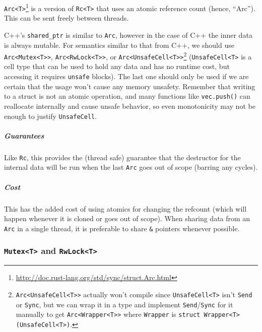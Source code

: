 \documentclass[a4paper,]{book}
\renewcommand{\href}[2]{#2\footnote{\url{#1}}}
\let\oldsubparagraph\subparagraph
\renewcommand{\subparagraph}[1]{\oldsubparagraph{#1}\mbox{}}
\begin{document}
\href{http://doc.rust-lang.org/std/sync/struct.Arc.html}{\texttt{Arc\textless{}T\textgreater{}}}
is a version of \texttt{Rc\textless{}T\textgreater{}} that uses an
atomic reference count (hence, ``Arc''). This can be sent freely between
threads.

C++'s \texttt{shared\_ptr} is similar to \texttt{Arc}, however in the
case of C++ the inner data is always mutable. For semantics similar to
that from C++, we should use
\texttt{Arc\textless{}Mutex\textless{}T\textgreater{}\textgreater{}},
\texttt{Arc\textless{}RwLock\textless{}T\textgreater{}\textgreater{}},
or
\texttt{Arc\textless{}UnsafeCell\textless{}T\textgreater{}\textgreater{}}\footnote{\texttt{Arc\textless{}UnsafeCell\textless{}T\textgreater{}\textgreater{}}
  actually won't compile since
  \texttt{UnsafeCell\textless{}T\textgreater{}} isn't \texttt{Send} or
  \texttt{Sync}, but we can wrap it in a type and implement
  \texttt{Send}/\texttt{Sync} for it manually to get
  \texttt{Arc\textless{}Wrapper\textless{}T\textgreater{}\textgreater{}}
  where \texttt{Wrapper} is
  \texttt{struct\ Wrapper\textless{}T\textgreater{}(UnsafeCell\textless{}T\textgreater{})}.}
(\texttt{UnsafeCell\textless{}T\textgreater{}} is a cell type that can
be used to hold any data and has no runtime cost, but accessing it
requires \texttt{unsafe} blocks). The last one should only be used if we
are certain that the usage won't cause any memory unsafety. Remember
that writing to a struct is not an atomic operation, and many functions
like \texttt{vec.push()} can reallocate internally and cause unsafe
behavior, so even monotonicity may not be enough to justify
\texttt{UnsafeCell}.

\subparagraph{Guarantees}\label{guarantees-3}

Like \texttt{Rc}, this provides the (thread safe) guarantee that the
destructor for the internal data will be run when the last \texttt{Arc}
goes out of scope (barring any cycles).

\subparagraph{Cost}\label{cost-3}

This has the added cost of using atomics for changing the refcount
(which will happen whenever it is cloned or goes out of scope). When
sharing data from an \texttt{Arc} in a single thread, it is preferable
to share \texttt{\&} pointers whenever possible.

\subsubsection{\texorpdfstring{\texttt{Mutex\textless{}T\textgreater{}}
and
\texttt{RwLock\textless{}T\textgreater{}}}{Mutex\textless{}T\textgreater{} and RwLock\textless{}T\textgreater{}}}\label{mutext-and-rwlockt}
\end{document}
